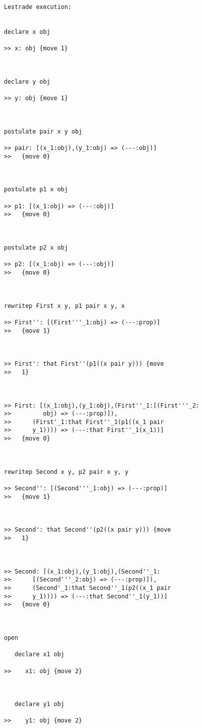 \documentclass[12pt]{article}
\begin{document}
\begin{verbatim}Lestrade execution:


declare x obj

>> x: obj {move 1}



declare y obj

>> y: obj {move 1}



postulate pair x y obj

>> pair: [(x_1:obj),(y_1:obj) => (---:obj)]
>>   {move 0}



postulate p1 x obj

>> p1: [(x_1:obj) => (---:obj)]
>>   {move 0}



postulate p2 x obj

>> p2: [(x_1:obj) => (---:obj)]
>>   {move 0}



rewritep First x y, p1 pair x y, x

>> First'': [(First'''_1:obj) => (---:prop)]
>>   {move 1}



>> First': that First''(p1((x pair y))) {move
>>   1}



>> First: [(x_1:obj),(y_1:obj),(First''_1:[(First'''_2:
>>         obj) => (---:prop)]),
>>      (First'_1:that First''_1(p1((x_1 pair
>>      y_1)))) => (---:that First''_1(x_1))]
>>   {move 0}



rewritep Second x y, p2 pair x y, y

>> Second'': [(Second'''_1:obj) => (---:prop)]
>>   {move 1}



>> Second': that Second''(p2((x pair y))) {move
>>   1}



>> Second: [(x_1:obj),(y_1:obj),(Second''_1:
>>      [(Second'''_2:obj) => (---:prop)]),
>>      (Second'_1:that Second''_1(p2((x_1 pair
>>      y_1)))) => (---:that Second''_1(y_1))]
>>   {move 0}



open

   declare x1 obj

>>    x1: obj {move 2}



   declare y1 obj

>>    y1: obj {move 2}




\end{verbatim}
\end{document}
